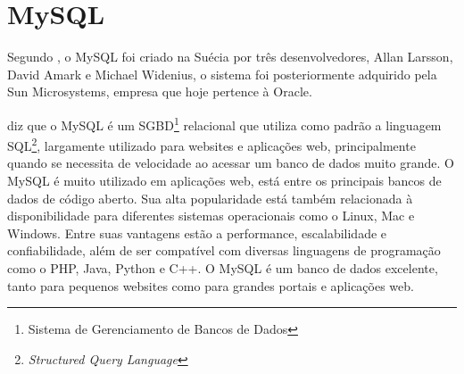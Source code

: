 \section{MySQL}
	\par Segundo , o MySQL foi criado na Suécia por três desenvolvedores, Allan Larsson, David Amark e Michael Widenius, o sistema foi posteriormente adquirido pela Sun Microsystems, empresa que hoje pertence à Oracle.
	\par {} diz que o MySQL é um SGBD\footnote{Sistema de Gerenciamento de Bancos de Dados} relacional que utiliza como padrão a linguagem SQL\footnote{\textit{Structured Query Language}}, largamente utilizado para websites e aplicações web, principalmente quando se necessita de velocidade ao acessar um banco de dados muito grande. O MySQL é muito utilizado em aplicações web, está entre os principais bancos de dados de código aberto. Sua alta popularidade está também relacionada à disponibilidade para diferentes sistemas operacionais como o Linux, Mac e Windows. Entre suas vantagens estão a performance, escalabilidade e confiabilidade, além de ser compatível com diversas linguagens de programação como o PHP, Java, Python e C++. O MySQL é um banco de dados excelente, tanto para pequenos websites como para grandes portais e aplicações web.







